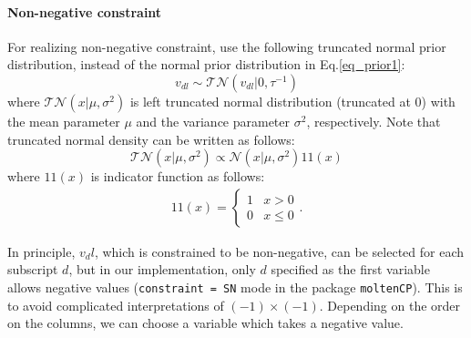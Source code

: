\documentclass[a4paper,12ptc]{jsarticle} %
\newcommand{\normal}{\mathcal{N}}
\newcommand{\truncnorm}{\mathcal{TN}}
\newcommand{\one}{1\!\!1}
\begin{document}
\paragraph{Non-negative constraint}
For realizing non-negative constraint,  use the following truncated normal prior distribution, instead of the normal prior distribution in Eq.\ref{eq_prior1}:
\begin{equation}
v_{dl} \sim \truncnorm(v_{dl} | 0, \tau^{-1}) \label{eq_prior2}
\end{equation}
where $\truncnorm(x | \mu, \sigma^2)$ is left truncated normal distribution (truncated at 0) with the mean parameter $\mu$ and the variance parameter $\sigma^2$, respectively. 
Note that truncated normal density can be written as follows:
\begin{equation*}
   \truncnorm(x | \mu, \sigma^2) \propto    \normal(x | \mu, \sigma^2) \one(x) 
\end{equation*}
where $\one(x)$ is indicator function as follows:
\begin{align*}
    \one(x)=\begin{cases} 1 & x>0\\
    0 &x \leq 0\end{cases}.
\end{align*}

In principle, $v_dl$, which is constrained to be non-negative, can be selected for each subscript $d$, but in our implementation, only $d$ specified as the first variable allows negative values (\verb|constraint = SN| mode in the package \verb|moltenCP|). 
This is to avoid complicated interpretations of $(-1)\times(-1)$. Depending on the order on the columns, we can choose a variable which takes a negative value.
\end{document}
